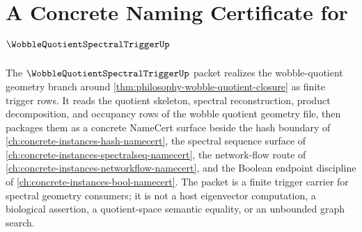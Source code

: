 \chapter{A Concrete Naming Certificate for $\WobbleQuotientSpectralTriggerUp$}
\label{ch:concrete-instances-wobble-quotient-spectral-trigger-namecert}

The $\WobbleQuotientSpectralTriggerUp$ packet realizes the wobble-quotient geometry branch around \autoref{thm:philosophy-wobble-quotient-closure} as finite trigger rows. It reads the quotient skeleton, spectral reconstruction, product decomposition, and occupancy rows of the wobble quotient geometry file, then packages them as a concrete NameCert surface beside the hash boundary of \autoref{ch:concrete-instances-hash-namecert}, the spectral sequence surface of \autoref{ch:concrete-instances-spectralseq-namecert}, the network-flow route of \autoref{ch:concrete-instances-networkflow-namecert}, and the Boolean endpoint discipline of \autoref{ch:concrete-instances-bool-namecert}. The packet is a finite trigger carrier for spectral geometry consumers; it is not a host eigenvector computation, a biological assertion, a quotient-space semantic equality, or an unbounded graph search.



